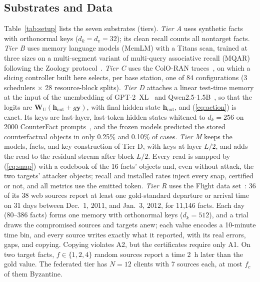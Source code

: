 \documentclass[journal]{IEEEtran}
\theoremstyle{remark}
\begin{document}
\subsection{Substrates and Data}
Table~\ref{tab:setup} lists the seven substrates (tiers). \emph{Tier A} uses synthetic facts with orthonormal keys ($d_k=d_v=32$); its clean recall counts all nontarget facts. \emph{Tier B} uses memory language models (MemLM) with a Titans scan, trained at three sizes on a multi-segment variant of multi-query associative recall (MQAR) following the Zoology protocol~\cite{arora2024zoology}. \emph{Tier C} uses the ColO-RAN traces~\cite{polese2023coloran}, on which a slicing controller built here selects, per base station, one of 84 configurations (3 schedulers $\times$ 28 resource-block splits). \emph{Tier D} attaches a linear test-time memory at the input of the unembedding of \mbox{GPT-2}~XL~\cite{radford2019gpt2} and \mbox{Qwen2.5-1.5B}~\cite{qwen2024qwen25}, so that the logits are $\bm{W}_U(\bm{h}_{\mathrm{out}}+g\bm{y})$, with final hidden state $\bm{h}_{\mathrm{out}}$, and (\ref{eq:action}) is exact. Its keys are last-layer, last-token hidden states whitened to $d_k=256$ on 2000 CounterFact prompts~\cite{meng2022rome}, and the frozen models predicted the stored counterfactual objects in only 0.25\% and 0.10\% of cases. \emph{Tier M} keeps the models, facts, and key construction of Tier D, with keys at layer $L/2$, and adds the read to the residual stream after block $L/2$. Every read is snapped by (\ref{eq:snap}) with a codebook of the 16 facts' objects and, even without attack, the two targets' attacker objects; recall and installed rates inject every snap, certified or not, and all metrics use the emitted token. \emph{Tier R} uses the Flight data set~\cite{li2012truth}: 36 of its 38 web sources report at least one gold-standard departure or arrival time on 31 days between Dec.~1, 2011, and Jan.~3, 2012, for 11,146 facts. Each day (80--386 facts) forms one memory with orthonormal keys ($d_k=512$), and a trial draws the compromised sources and targets anew; each value encodes a 10-minute time bin, and every source writes exactly what it reported, with its real errors, gaps, and copying. Copying violates A2, but the certificates require only A1. On two target facts, $f\in\{1,2,4\}$ random sources report a time 2~h later than the gold value. The federated tier has $N=12$ clients with 7 sources each, at most $f_c$ of them Byzantine.
\end{document}
